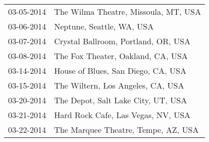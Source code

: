 \begin{supertabular}{ll}
 03-05-2014 &  The Wilma Theatre, Missoula, MT, USA \\
 03-06-2014 &             Neptune, Seattle, WA, USA \\
 03-07-2014 &   Crystal Ballroom, Portland, OR, USA \\
 03-08-2014 &     The Fox Theater, Oakland, CA, USA \\
 03-14-2014 &    House of Blues, San Diego, CA, USA \\
 03-15-2014 &     The Wiltern, Los Angeles, CA, USA \\
 03-20-2014 &    The Depot, Salt Lake City, UT, USA \\
 03-21-2014 &    Hard Rock Cafe, Las Vegas, NV, USA \\
 03-22-2014 &   The Marquee Theatre, Tempe, AZ, USA \\
\end{supertabular}
